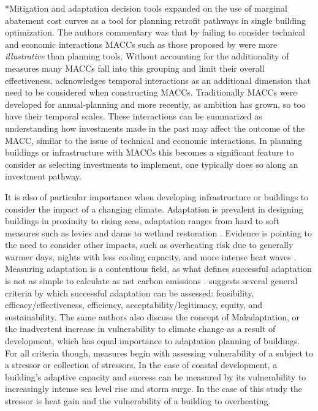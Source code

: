 \documentclass[twocolumn, a4paper,10pt]{article}
\makeatletter
\renewcommand\subsection{\@startsection{subsection}{1}{\z@}{\z@}{\z@}{\normalfont\normalsize\bfseries}}
\renewcommand\subsection{\@startsection{subsection}{1}{\z@}{\z@}{0.1pt}{\normalfont\normalsize\bfseries}}
\makeatother
\begin{document}
\subsection*{Mitigation and adaptation decision tools}
\citet{rysanek_using_2013} expanded on the use of marginal abatement cost curves as a tool for planning retrofit pathways in single building optimization. The authors commentary was that by failing to consider technical and economic interactions MACCs such as those proposed by \citet{mckinsey__co_climate_2010} were more \textit{illustrative} than planning tools. Without accounting for the additionality of measures many MACCs fall into this grouping and limit their overall effectiveness. \citet{kesicki_marginal_nodate} acknowledges temporal interactions as an additional dimension that need to be considered when constructing MACCs. Traditionally MACCs were developed for annual-planning and more recently, as ambition has grown, so too have their temporal scales. These interactions can be summarized as understanding how investments made in the past may affect the outcome of the MACC, similar to the issue of technical and economic interactions. In planning buildings or infrastructure with MACCs this becomes a significant feature to consider as selecting investments to implement, one typically does so along an investment pathway. 

It is also of particular importance when developing infrastructure or buildings to consider the impact of a changing climate. Adaptation is prevalent in designing buildings in proximity to rising seas, adaptation ranges from hard to soft measures such as levies and dams to wetland restoration \citep{}. Evidence is pointing to the need to consider other impacts, such as overheating risk due to generally warmer days, nights with less cooling capacity, and more intense heat waves \citep{Lomas and Porrit; Rysanek ML Paper}. Measuring adaptation is a contentious field, as what defines successful adaptation is not as simple to calculate as net carbon emissions \citep{IPCC WGIIAR5 CH 14}. \citet{Brooks et al.} suggests several general criteria by which successful adaptation can be assessed: feasibility, efficacy/effectiveness, efficiency, acceptability/legitimacy, equity, and sustainability. The same authors also discuss the concept of Maladaptation, or the inadvertent increase in vulnerability to climate change as a result of development, which has equal importance to adaptation planning of buildings. For all criteria though, measures begin with assessing vulnerability of a subject to a stressor or collection of stressors. In the case of coastal development, a building's adaptive capacity and success can be measured by its vulnerability to increasingly intense sea level rise and storm surge. In the case of this study the stressor is heat gain and the vulnerability of a building to overheating. 
\end{document}
